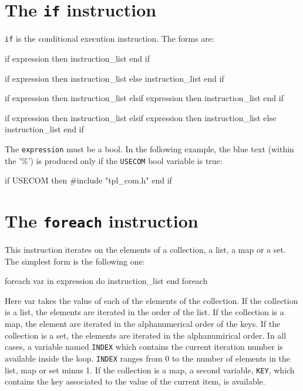 \documentclass[10pt,openright,twosides,final]{memoir}
\newcommand{\ccst}[1]{{\footnotesize\ttfamily\colorbox{light-blue}{'#1'}}}
\newcommand{\gtlinline}[1]{\colorbox{light-blue}{\lstinline[language=gtl]{#1}}}
\begin{document}
\section{The \texttt{if} instruction}

\gtlinline{if} is the conditional execution instruction. The forms are:

\begin{gtl}
if expression then
  instruction_list
end if

if expression then
  instruction_list
else
  instruction_list
end if

if expression then
  instruction_list
elsif expression then
  instruction_list
end if

if expression then
  instruction_list
elsif expression then
  instruction_list
else
  instruction_list
end if
\end{gtl}    

The \gtlinline{expression} must be a bool. In the following example, the blue text (within the \ccst{\%}) is produced only if the \gtlinline{USECOM} bool variable is true:

\begin{gtl}
if USECOM then %
#include "tpl_com.h" %
end if
\end{gtl}

\section{The \texttt{foreach} instruction}

This instruction iterates on the elements of a collection, a list, a map or a set. The simplest form is the following one:

\begin{gtl}
foreach var in expression do
  instruction_list
end foreach
\end{gtl}

Here var takes the value of each of the elements of the collection. If the collection is a list, the elements are iterated in the order of the list. If the collection is a map, the element are iterated in the alphanumerical order of the keys. If the collection is a set, the elements are iterated in the alphanumirical order. In all cases, a variable named \lstinline{INDEX} which contains the current iteration number is available inside the loop. \lstinline{INDEX} ranges from 0 to the number of elements in the list, map or set minus 1. If the collection is a map, a second variable, \lstinline{KEY}, which contains the key associated to the value of the current item, is available.
\end{document}
